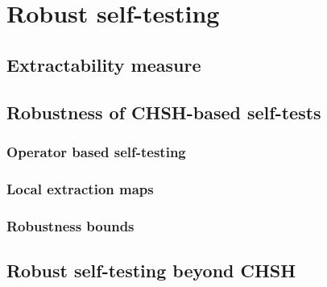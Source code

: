 \chapter{Robust self-testing}

\section{Extractability measure}

\section{Robustness of CHSH-based self-tests}

\subsection{Operator based self-testing}
\subsection{Local extraction maps}
\subsection{Robustness bounds}

\section{Robust self-testing beyond CHSH}
